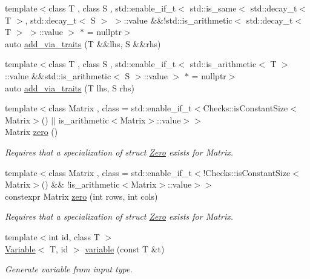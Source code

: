\begin{DoxyCompactItemize}
\item 
{\footnotesize template$<$class T , class S , std\+::enable\+\_\+if\+\_\+t$<$ std\+::is\+\_\+same$<$ std\+::decay\+\_\+t$<$ T $>$, std\+::decay\+\_\+t$<$ S $>$ $>$\+::value \&\&!std\+::is\+\_\+arithmetic$<$ std\+::decay\+\_\+t$<$ T $>$ $>$\+::value $>$ $\ast$  = nullptr$>$ }\\auto \hyperlink{namespaceFunG_a1aa47c6870754d5d74100568cd3ef532}{add\+\_\+via\+\_\+traits} (T \&\&lhs, S \&\&rhs)
\item 
{\footnotesize template$<$class T , class S , std\+::enable\+\_\+if\+\_\+t$<$ std\+::is\+\_\+arithmetic$<$ T $>$\+::value \&\&std\+::is\+\_\+arithmetic$<$ S $>$\+::value $>$ $\ast$  = nullptr$>$ }\\auto \hyperlink{namespaceFunG_a6cbaa3b1b61e5834b38db5c831e3c25e}{add\+\_\+via\+\_\+traits} (T lhs, S rhs)
\item 
{\footnotesize template$<$class Matrix , class  = std\+::enable\+\_\+if\+\_\+t$<$\+Checks\+::is\+Constant\+Size$<$\+Matrix$>$() $\vert$$\vert$ is\+\_\+arithmetic$<$\+Matrix$>$\+::value$>$$>$ }\\Matrix \hyperlink{namespaceFunG_a649b4470d6def401959bfea3a368c48c}{zero} ()
\begin{DoxyCompactList}\small\item\em Requires that a specialization of struct \hyperlink{structFunG_1_1Zero}{Zero} exists for Matrix. \end{DoxyCompactList}\item 
{\footnotesize template$<$class Matrix , class  = std\+::enable\+\_\+if\+\_\+t$<$!\+Checks\+::is\+Constant\+Size$<$\+Matrix$>$() \&\& !is\+\_\+arithmetic$<$\+Matrix$>$\+::value$>$$>$ }\\constexpr Matrix \hyperlink{namespaceFunG_ae633433339ba30207aa526e54e3924b4}{zero} (int rows, int cols)
\begin{DoxyCompactList}\small\item\em Requires that a specialization of struct \hyperlink{structFunG_1_1Zero}{Zero} exists for Matrix. \end{DoxyCompactList}\item 
{\footnotesize template$<$int id, class T $>$ }\\\hyperlink{structFunG_1_1Variable}{Variable}$<$ T, id $>$ \hyperlink{namespaceFunG_a2ead025b35a8cdf3ac8c170524ab61c0}{variable} (const T \&t)
\begin{DoxyCompactList}\small\item\em Generate variable from input type. \end{DoxyCompactList}\end{DoxyCompactItemize}


